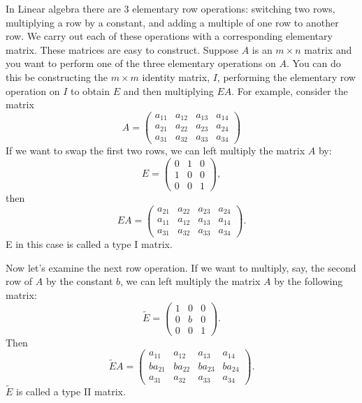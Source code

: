 \label{lab:LUdecomp}

In Linear algebra there are 3 elementary row operations: switching two rows, multiplying a row by a constant, and adding a multiple of one row to another row.
We carry out each of these operations with a corresponding elementary matrix.
These matrices are easy to construct.
Suppose $A$ is an $m \times n$ matrix and you want to perform one of the three elementary operations on $A$.
You can do this be constructing the $m \times m$ identity matrix, $I$, performing the elementary row operation on $I$ to obtain $E$ and then multiplying $EA$.
For example, consider the matrix
\[
A = \begin{pmatrix}
a_{11}&a_{12}&a_{13}&a_{14}\\
a_{21}&a_{22}&a_{23}&a_{24}\\
a_{31}&a_{32}&a_{33}&a_{34}
\end{pmatrix}
\]
If we want to swap the first two rows, we can left multiply the
matrix $A$ by:
\[
E = \begin{pmatrix}
0&1&0\\
1&0&0\\
0&0&1
\end{pmatrix},
\]
then
\[
E A =
\begin{pmatrix}
a_{21}&a_{22}&a_{23}&a_{24}\\
a_{11}&a_{12}&a_{13}&a_{14}\\
a_{31}&a_{32}&a_{33}&a_{34}
\end{pmatrix}.
\]
E in this case is called a type I matrix.

Now let's examine the next row operation.
If we want to multiply, say, the second row of $A$ by the constant $b$, we can left multiply the matrix $A$ by the following matrix:
\[
\tilde{E} = \begin{pmatrix}
1&0&0\\
0&b&0\\
0&0&1
\end{pmatrix}.
\]
Then
\[
\tilde{E} A =
\begin{pmatrix}
a_{11}&a_{12}&a_{13}&a_{14}\\
b a_{21}&b a_{22}&b a_{23}&b a_{24}\\
a_{31}&a_{32}&a_{33}&a_{34}
\end{pmatrix}.
\]
$\tilde{E}$ is called a type II matrix.  

